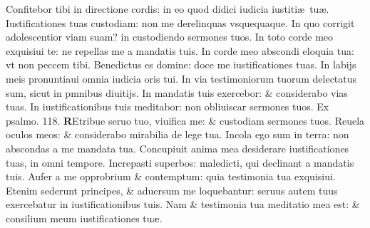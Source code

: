 \documentclass[a5paper,10pt]{book}
\def\ae{æ}
\begin{document}
\begin{multicols*}{2}
\newline \color{red} C\color{black}onfitebor tibi in directione cordis: in eo quod didici iudicia iustiti\ae \ tu\ae .
\newline \color{red} I\color{black}ustificationes tuas custodiam: non me derelinquas vsquequaque.
\newline \color{red} I\color{black}n quo corrigit adolescentior viam suam? in custodiendo sermones tuos.
\newline \color{red} I\color{black}n toto corde meo exquisiui te: ne repellas me a mandatis tuis.
\newline \color{red} I\color{black}n corde meo abscondi eloquia tua: vt non peccem tibi.
\newline \color{red} B\color{black}enedictus es domine: doce me iustificationes tuas.
\newline \color{red} I\color{black}n labijs meis pronuntiaui omnia iudicia oris tui.
\newline \color{red} I\color{black}n via testimoniorum tuorum delectatus sum, sicut in pmnibus diuitijs.
\newline \color{red} I\color{black}n mandatis tuis exercebor: \& considerabo vias tuas.
\newline \color{red} I\color{black}n iustificationibus tuis meditabor: non obliuiscar sermones tuos. 
\newline \color{red} Ex psalmo. \hypertarget{ps118.2}{118.} \color{black}
\vspace{+.25em}
\lettrine[lines=2]{\bfseries \color{red} R}{}Etribue seruo tuo, viuifica me: \& custodiam sermones tuos.
\newline \color{red} R\color{black}euela oculos meos: \& considerabo mirabilia de lege tua.
\newline \color{red} I\color{black}ncola ego sum in terra: non abscondas a me mandata tua.
\newline \color{red} C\color{black}oncupiuit anima mea desiderare iustificationes tuas, in omni tempore.
\newline \color{red} I\color{black}ncrepasti superbos: maledicti, qui declinant a mandatis tuis.
\newline \color{red} A\color{black}ufer a me opprobrium \& contemptum: quia testimonia tua exquisiui.
\newline \color{red} E\color{black}tenim sederunt principes, \& aduersum me loquebantur: seruus autem tuus exercebatur in iustificationibus tuis.
\newline \color{red} N\color{black}am \& testimonia tua meditatio mea est: \& consilium meum iustificationes tu\ae .

\end{multicols*}
\end{document}
